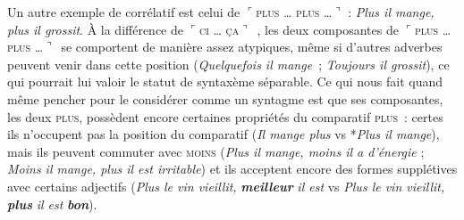 {    Un autre exemple de corrélatif est celui de \textrm{$⌜$}\textsc{plus} \textsc{…} \textsc{plus} \textsc{…}\textrm{$⌝$} : \textit{Plus il mange, plus il grossit}. À la différence de \textrm{$⌜$}\textsc{ci} \textsc{…} \textsc{ça}\textrm{$⌝$}~, les deux composantes de \textrm{$⌜$}\textsc{plus} \textsc{…} \textsc{plus} \textsc{…}\textrm{$⌝$}~se comportent de manière assez atypiques, même si d’autres adverbes peuvent venir dans cette position (\textit{Quelquefois il mange~}; \textit{Toujours il grossit}), ce qui pourrait lui valoir le statut de syntaxème séparable. Ce qui nous fait quand même pencher pour le considérer comme un syntagme est que ses composantes, les deux \textsc{plus}, possèdent encore certaines propriétés du comparatif \textsc{plus~}: certes ils n’occupent pas la position du comparatif (\textit{Il mange plus} vs *\textit{Plus il mange}), mais ils peuvent commuter avec \textsc{moins} (\textit{Plus il mange, moins il a d’énergie} ; \textit{Moins il mange, plus il est irritable}) et ils acceptent encore des formes supplétives avec certains adjectifs (\textit{Plus le vin vieillit,} \textbf{\textit{meilleur}} \textit{il est} vs \textit{Plus le vin vieillit,} \textbf{\textit{plus}} \textit{il est} \textbf{\textit{bon}}).
}
